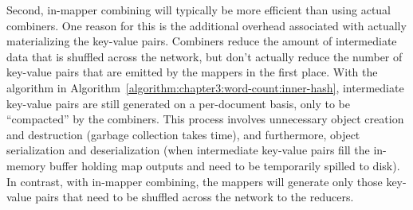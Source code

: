 \documentclass[11pt]{article}
\begin{document}
Second, in-mapper combining will typically be more efficient than
using actual combiners.  One reason for this is the additional
overhead associated with actually materializing the key-value pairs.
Combiners reduce the amount of intermediate data that is shuffled
across the network, but don't actually reduce the number of key-value
pairs that are emitted by the mappers in the first place.  With the
algorithm in Algorithm~\ref{algorithm:chapter3:word-count:inner-hash},
intermediate key-value pairs are still generated on a per-document
basis, only to be ``compacted'' by the combiners.  This process
involves unnecessary object creation and destruction (garbage
collection takes time), and furthermore, object serialization and
deserialization (when intermediate key-value pairs fill the in-memory
buffer holding map outputs and need to be temporarily spilled to
disk). In contrast, with in-mapper combining, the mappers will
generate only those key-value pairs that need to be shuffled across
the network to the reducers.
\end{document}
